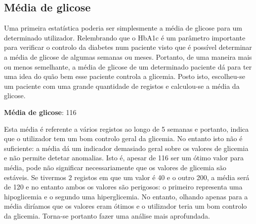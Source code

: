 \subsection{Média de glicose}

Uma primeira estatística poderia ser simplesmente a média de glicose para um determinado utilizador. Relembrando que o HbA1c é um parâmetro importante para verificar o controlo da diabetes num paciente visto que é possível determinar a média de glicose de algumas semanas ou meses. Portanto, de uma maneira mais ou menos semelhante, a média de glicose de um determinado paciente dá para ter uma idea do quão bem esse paciente controla a glicemia. Posto isto, escolheu-se um paciente com uma grande quantidade de registos e calculou-se a média da glicose. 

\textbf{Média de glicose}: 116

Esta média é referente a vários registos ao longo de 5 semanas e portanto, indica que o utilizador tem um bom controlo geral da glicemia. No entanto isto não é suficiente: a média dá um indicador demasiado geral sobre os valores de glicemia e não permite detetar anomalias. Isto é, apesar de 116 ser um ótimo valor para média, pode não significar necessariamente que os valores de glicemia são estáveis. Se tivermos 2 registos em que um valor é 40 e o outro 200, a média será de 120 e no entanto ambos os valores são perigosos: o primeiro representa uma hipoglicemia e o segundo uma hiperglicemia. No entanto, olhando apenas para a média diríamos que os valores eram ótimos e o utilizador teria um bom controlo da glicemia. Torna-se portanto fazer uma análise mais aprofundada.
